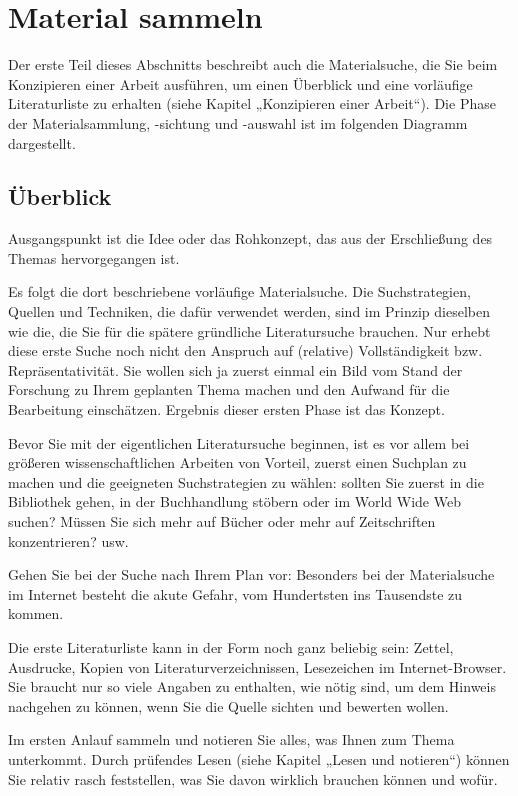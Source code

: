 \documentclass[]{book}
\theoremstyle{definition}
\theoremstyle{definition}
\theoremstyle{definition}
\theoremstyle{remark}
\begin{document}
\section{Material sammeln}\label{recherchieren-material-sammeln}

Der erste Teil dieses Abschnitts beschreibt auch die Materialsuche, die
Sie beim Konzipieren einer Arbeit ausführen, um einen Überblick und eine
vorläufige Literaturliste zu erhalten (siehe Kapitel „Konzipieren einer
Arbeit``). Die Phase der Materialsammlung, -sichtung und -auswahl ist im
folgenden Diagramm dargestellt.

\subsection{Überblick}\label{uberblick}

Ausgangspunkt ist die Idee oder das Rohkonzept, das aus der Erschließung
des Themas hervorgegangen ist.

Es folgt die dort beschriebene vorläufige Materialsuche. Die
Suchstrategien, Quellen und Techniken, die dafür verwendet werden, sind
im Prinzip dieselben wie die, die Sie für die spätere gründliche
Literatursuche brauchen. Nur erhebt diese erste Suche noch nicht den
Anspruch auf (relative) Vollständigkeit bzw. Repräsentativität. Sie
wollen sich ja zuerst einmal ein Bild vom Stand der Forschung zu Ihrem
geplanten Thema machen und den Aufwand für die Bearbeitung einschätzen.
Ergebnis dieser ersten Phase ist das Konzept.

Bevor Sie mit der eigentlichen Literatursuche beginnen, ist es vor allem
bei größeren wissenschaftlichen Arbeiten von Vorteil, zuerst einen
Suchplan zu machen und die geeigneten Suchstrategien zu wählen: sollten
Sie zuerst in die Bibliothek gehen, in der Buchhandlung stöbern oder im
World Wide Web suchen? Müssen Sie sich mehr auf Bücher oder mehr auf
Zeitschriften konzentrieren? usw.

Gehen Sie bei der Suche nach Ihrem Plan vor: Besonders bei der
Materialsuche im Internet besteht die akute Gefahr, vom Hundertsten ins
Tausendste zu kommen.

Die erste Literaturliste kann in der Form noch ganz beliebig sein:
Zettel, Ausdrucke, Kopien von Literaturverzeichnissen, Lesezeichen im
Internet-Browser. Sie braucht nur so viele Angaben zu enthalten, wie
nötig sind, um dem Hinweis nachgehen zu können, wenn Sie die Quelle
sichten und bewerten wollen.

Im ersten Anlauf sammeln und notieren Sie alles, was Ihnen zum Thema
unterkommt. Durch prüfendes Lesen (siehe Kapitel „Lesen und notieren``)
können Sie relativ rasch feststellen, was Sie davon wirklich brauchen
können und wofür.
\end{document}
